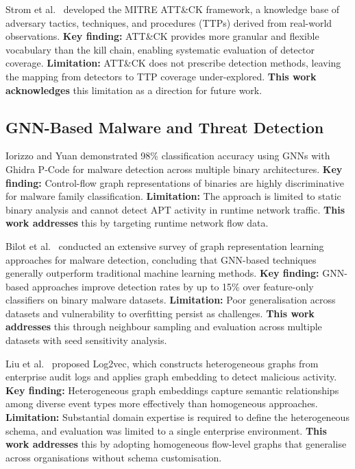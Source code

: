 \documentclass[conference]{IEEEtran}
\begin{document}
Strom et al.~\cite{strom2018} developed the MITRE ATT\&CK framework, a
knowledge base of adversary tactics, techniques, and procedures (TTPs) derived
from real-world observations. \textbf{Key finding:} ATT\&CK provides more
granular and flexible vocabulary than the kill chain, enabling systematic
evaluation of detector coverage. \textbf{Limitation:} ATT\&CK does not
prescribe detection methods, leaving the mapping from detectors to TTP coverage
under-explored. \textbf{This work acknowledges} this limitation as a direction
for future work.

\subsection{GNN-Based Malware and Threat Detection}

Iorizzo and Yuan \cite{iorizzo2024} demonstrated 98\% classification accuracy
using GNNs with Ghidra P-Code for malware detection across multiple binary
architectures. \textbf{Key finding:} Control-flow graph representations of
binaries are highly discriminative for malware family classification.
\textbf{Limitation:} The approach is limited to static binary analysis and
cannot detect APT activity in runtime network traffic. \textbf{This work
addresses} this by targeting runtime network flow data.

Bilot et al.~\cite{bilot2024} conducted an extensive survey of graph
representation learning approaches for malware detection, concluding that
GNN-based techniques generally outperform traditional machine learning methods.
\textbf{Key finding:} GNN-based approaches improve detection rates by up to
15\% over feature-only classifiers on binary malware datasets.
\textbf{Limitation:} Poor generalisation across datasets and vulnerability to
overfitting persist as challenges. \textbf{This work addresses} this through
neighbour sampling and evaluation across multiple datasets with seed sensitivity
analysis.

Liu et al.~\cite{liu2018} proposed Log2vec, which constructs heterogeneous
graphs from enterprise audit logs and applies graph embedding to detect malicious
activity. \textbf{Key finding:} Heterogeneous graph embeddings capture semantic
relationships among diverse event types more effectively than homogeneous
approaches. \textbf{Limitation:} Substantial domain expertise is required to
define the heterogeneous schema, and evaluation was limited to a single
enterprise environment. \textbf{This work addresses} this by adopting
homogeneous flow-level graphs that generalise across organisations without
schema customisation.
\end{document}
